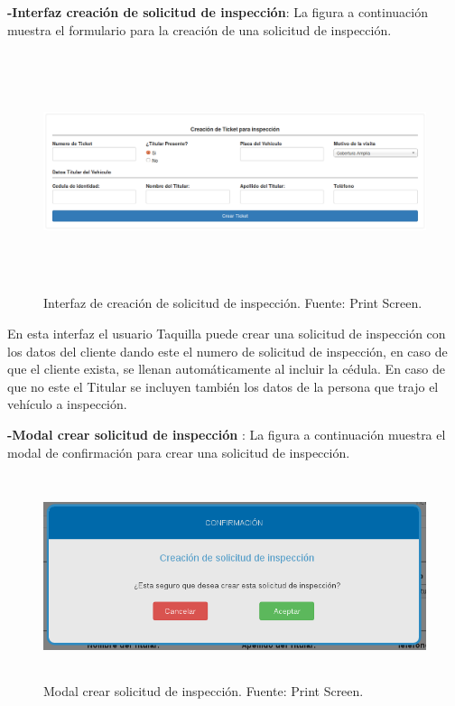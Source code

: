 \textbf{-Interfaz creación de solicitud de inspección}: La figura a continuación muestra el formulario para la creación de una solicitud de inspección.

\begin{figure}[H]
\begin{center}
	\includegraphics[width=\textwidth,height=7cm]{img/interfaces/crear_ticket_solicitud.png}
\end{center}
\caption{Interfaz de creación de solicitud de inspección. Fuente: Print Screen.}
\label{fig:interfaz_crear_solicitud_inspeccion}
\end{figure}

En esta interfaz el usuario Taquilla puede crear una solicitud de inspección con los datos del cliente dando este el numero de solicitud de inspección, en caso de que el cliente exista, se llenan automáticamente al incluir la cédula. En caso de que no este el Titular se incluyen también los datos de la persona que trajo el vehículo a inspección.

\newpage
\textbf{-Modal crear solicitud de inspección }: La figura a continuación muestra el modal de confirmación para crear una solicitud de inspección.

\begin{figure}[H]
\begin{center}
	\includegraphics[width=14cm,height=6cm]{img/interfaces/modal_confirmar_creacion_solicitud.png}
\end{center}
\caption{Modal crear solicitud de inspección. Fuente: Print Screen.}
\label{fig:modal_confirmacion_crear_solicitud}
\end{figure}



